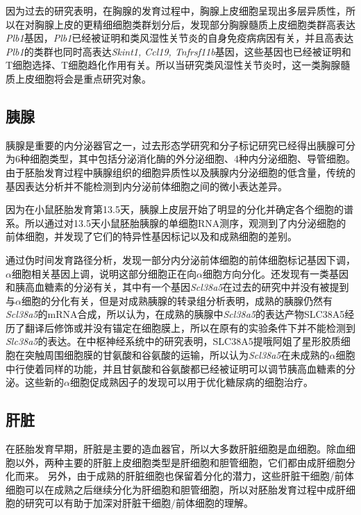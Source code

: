 \documentclass[lang=cn]{elegantpaper}
\begin{document}
因为过去的研究表明，在胸腺的发育过程中，胸腺上皮细胞呈现出多层异质性\citep{fischer_beyond_2017}，所以在对胸腺上皮的更精细细胞类群划分后，\cite{kernfeld_single-cell_2018}发现部分胸腺髓质上皮细胞类群高表达\emph{Plb1}基因，\emph{Plb1}已经被证明和类风湿性关节炎的自身免疫病病因有关\citep{okada_integration_2014}，并且高表达\emph{Plb1}的类群也同时高表达\emph{Skint1, Ccl19, Tnfrsf11b}基因，这些基因也已经被证明和T细胞选择、T细胞趋化作用有关\citep{hikosaka_cytokine_2008}。所以当研究类风湿性关节炎时，这一类胸腺髓质上皮细胞将会是重点研究对象。

\subsection{胰腺}
胰腺是重要的内分泌器官之一，过去形态学研究和分子标记研究已经得出胰腺可分为6种细胞类型，其中包括分泌消化酶的外分泌细胞、4种内分泌细胞、导管细胞\citep{edlund_transcribing_1998}。由于胚胎发育过程中胰腺组织的细胞异质性以及胰腺内分泌细胞的低含量，传统的基因表达分析并不能检测到内分泌前体细胞之间的微小表达差异\citep{saliba_single-cell_2014}。

因为在小鼠胚胎发育第13.5天，胰腺上皮层开始了明显的分化并确定各个细胞的谱系\citep{pan_pancreas_2011}。所以通过对13.5天小鼠胚胎胰腺的单细胞RNA测序，\cite{stanescu_single_2017}观测到了内分泌细胞的前体细胞，并发现了它们的特异性基因标记以及和成熟细胞的差别。

通过伪时间发育路径分析，\cite{stanescu_single_2017}发现一部分内分泌前体细胞的前体细胞标记基因下调，$\alpha
$细胞相关基因上调，说明这部分细胞正在向$\alpha$细胞方向分化。\cite{stanescu_single_2017}还发现有一类基因和胰高血糖素的分泌有关，其中有一个基因\emph{Scl38a5}在过去的研究中并没有被提到与$\alpha$细胞的分化有关，但是对成熟胰腺的转录组分析表明，成熟的胰腺仍然有\emph{Scl38a5}的mRNA合成\citep{xin_use_2016}，所以\cite{stanescu_single_2017}认为，在成熟的胰腺中\emph{Scl38a5}的表达产物SLC38A5经历了翻译后修饰或并没有锚定在细胞膜上，所以在原有的实验条件下并不能检测到\emph{Slc38a5}的表达。在中枢神经系统中的研究表明，SLC38A5提哦阿姐了星形胶质细胞在突触周围细胞膜的甘氨酸和谷氨酸的运输\citep{hamdani_system_2012}，所以\cite{stanescu_single_2017}认为\emph{Scl38a5}在未成熟的$\alpha$细胞中行使着同样的功能，并且甘氨酸和谷氨酸都已经被证明可以调节胰高血糖素的分泌\citep{gao_glucose_1999}。这些新的$\alpha$细胞促成熟因子的发现可以用于优化糖尿病的细胞治疗。

\subsection{肝脏}
在胚胎发育早期，肝脏是主要的造血器官，所以大多数肝脏细胞是血细胞\citep{miyajima_stem/progenitor_2014}。除血细胞以外，两种主要的肝脏上皮细胞类型是肝细胞和胆管细胞，它们都由成肝细胞分化而来\citep{gordillo_orchestrating_2015}。
另外，由于成熟的肝脏细胞也保留着分化的潜力，这些肝脏干细胞/前体细胞可以在成熟之后继续分化为肝细胞和胆管细胞\citep{miyajima_stem/progenitor_2014}，所以对胚胎发育过程中成肝细胞的研究可以有助于加深对肝脏干细胞/前体细胞的理解。
\end{document}
